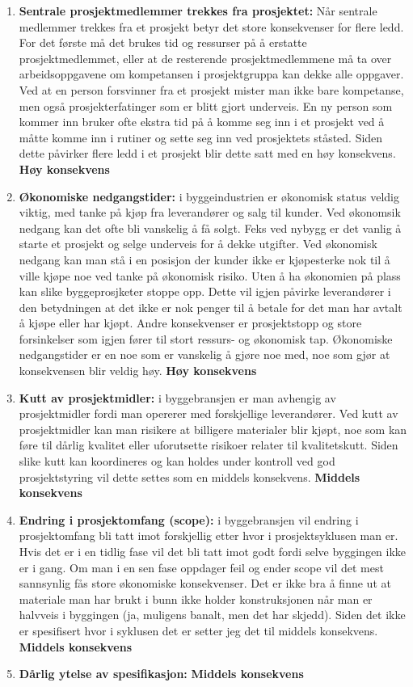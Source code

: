 		\begin{enumerate}
			\item{\bf Sentrale prosjektmedlemmer trekkes fra prosjektet:} 
			Når sentrale medlemmer trekkes fra et prosjekt betyr det store konsekvenser for flere ledd.
			For det første må det brukes tid og ressurser på å erstatte prosjektmedlemmet, eller at
			de resterende prosjektmedlemmene må ta over arbeidsoppgavene om kompetansen i prosjektgruppa
			kan dekke alle oppgaver. Ved at en person forsvinner fra et prosjekt mister man ikke bare
			kompetanse, men også prosjekterfatinger som er blitt gjort underveis. En ny person som kommer
			inn bruker ofte ekstra tid på å komme seg inn i et prosjekt ved å måtte komme inn i rutiner
			og sette seg inn ved prosjektets ståsted. Siden dette påvirker flere ledd i et prosjekt 
			blir dette satt med en høy konsekvens. 
			{\bf \color{red} Høy konsekvens}
			\item{\bf Økonomiske nedgangstider:} i byggeindustrien er økonomisk status veldig viktig,
			med tanke på kjøp fra leverandører og salg til kunder. Ved økonomsik nedgang kan det ofte bli
			vanskelig å få solgt. Feks ved nybygg er det vanlig å starte et prosjekt og selge underveis
			for å dekke utgifter. Ved økonomisk nedgang kan man stå i en posisjon der kunder ikke er
			kjøpesterke nok til å ville kjøpe noe ved tanke på økonomisk risiko. 
			Uten å ha økonomien på plass kan slike byggeprosjketer stoppe opp. Dette vil igjen 
			påvirke leverandører i den betydningen at det ikke er nok penger til å betale for det
			man har avtalt å kjøpe eller har kjøpt. Andre konsekvenser er prosjektstopp og store 
			forsinkelser som igjen fører til stort ressurs- og økonomisk tap. 
			Økonomiske nedgangstider er en noe som er vanskelig å gjøre noe med, noe som gjør
			at konsekvensen blir veldig høy. {\bf \color{red} Høy konsekvens}
			\item {\bf Kutt av prosjektmidler:} i byggebransjen er man avhengig av prosjektmidler 
			fordi man opererer med forskjellige leverandører. Ved kutt av prosjektmidler kan man 
			risikere at billigere materialer blir kjøpt, noe som kan føre til dårlig kvalitet eller
			uforutsette risikoer relater til kvalitetskutt. Siden slike kutt kan koordineres og kan 
			holdes under kontroll ved god prosjektstyring vil dette settes som en middels konsekvens. 
			{\bf \color{orange} Middels konsekvens}
			\item {\bf Endring i prosjektomfang (scope):} i byggebransjen vil endring i prosjektomfang
			bli tatt imot forskjellig etter hvor i prosjektsyklusen man er. Hvis det er i en tidlig
			fase vil det bli tatt imot godt fordi selve byggingen ikke er i gang. Om man i en sen fase
			oppdager feil og ender scope vil det mest sannsynlig fås store økonomiske konsekvenser. 
			Det er ikke bra å finne ut at materiale man har brukt i bunn ikke holder konstruksjonen
			når man er halvveis i byggingen (ja, muligens banalt, men det har skjedd).
			Siden det ikke er spesifisert hvor i syklusen det er setter jeg det til middels konsekvens. 
			{\bf \color{orange} Middels konsekvens}
			\item {\bf Dårlig ytelse av spesifikasjon:}
			{\bf \color{orange} Middels konsekvens}
		\end{enumerate}


